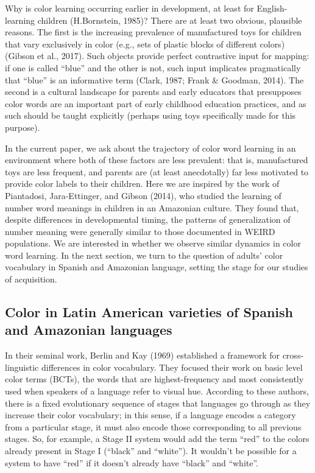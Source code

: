 \documentclass[
  english,
  ,man,floatsintext]{apa6}
\begin{document}
Why is color learning occurring earlier in development, at least for English-learning children (H.Bornstein, 1985)? There are at least two obvious, plausible reasons. The first is the increasing prevalence of manufactured toys for children that vary exclusively in color (e.g., sets of plastic blocks of different colors) (Gibson et al., 2017). Such objects provide perfect contrastive input for mapping: if one is called \enquote{blue} and the other is not, such input implicates pragmatically that \enquote{blue} is an informative term (Clark, 1987; Frank \& Goodman, 2014). The second is a cultural landscape for parents and early educators that presupposes color words are an important part of early childhood education practices, and as such should be taught explicitly (perhaps using toys specifically made for this purpose).

In the current paper, we ask about the trajectory of color word learning in an environment where both of these factors are less prevalent: that is, manufactured toys are less frequent, and parents are (at least anecdotally) far less motivated to provide color labels to their children. Here we are inspired by the work of Piantadosi, Jara‐Ettinger, and Gibson (2014), who studied the learning of number word meanings in children in an Amazonian culture. They found that, despite differences in developmental timing, the patterns of generalization of number meaning were generally similar to those documented in WEIRD populations. We are interested in whether we observe similar dynamics in color word learning. In the next section, we turn to the question of adults' color vocabulary in Spanish and Amazonian language, setting the stage for our studies of acquisition.

\hypertarget{color-in-latin-american-varieties-of-spanish-and-amazonian-languages}{%
\subsection{Color in Latin American varieties of Spanish and Amazonian languages}\label{color-in-latin-american-varieties-of-spanish-and-amazonian-languages}}

In their seminal work, Berlin and Kay (1969) established a framework for cross-linguistic differences in color vocabulary. They focused their work on basic level color terms (BCTs), the words that are highest-frequency and most consistently used when speakers of a language refer to visual hue. According to these authors, there is a fixed evolutionary sequence of stages that languages go through as they increase their color vocabulary; in this sense, if a language encodes a category from a particular stage, it must also encode those corresponding to all previous stages. So, for example, a Stage II system would add the term \enquote{red} to the colors already present in Stage I (\enquote{black} and \enquote{white}). It wouldn't be possible for a system to have \enquote{red} if it doesn't already have \enquote{black} and \enquote{white}.
\end{document}
